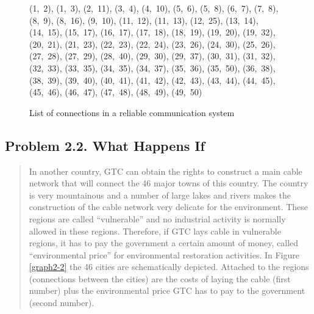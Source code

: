 \begin{enumerate}[(a)]
\begin{figure}[H]
	\centering
	\begin{multicols}{5}
(1,~2), (1,~3), (2,~11), (3,~4), (4,~10), (5,~6), (5,~8), (6,~7), (7,~8), (8,~9), (8,~16), (9,~10), (11,~12), (11,~13), (12,~25), (13,~14), (14,~15), (15,~17), (16,~17), (17,~18), (18,~19), (19,~20), (19,~32), (20,~21), (21,~23), (22,~23), (22,~24), (23,~26), (24,~30), (25,~26), (27,~28), (27,~29), (28,~40), (29,~30), (29,~37), (30,~31), (31,~32), (32,~33), (33,~35), (34,~35), (34,~37), (35,~36), (35,~50), (36,~38), (38,~39), (39,~40), (40,~41), (41,~42), (42,~43), (43,~44), (44,~45), (45,~46), (46,~47), (47,~48), (48,~49), (49,~50)
	\end{multicols}
	\caption{List of connections in a reliable communication system}
	\label{reliable1}
\end{figure}

\end{enumerate}

\subsection{Problem 2.2. What Happens If}
\begin{quote}In another country, GTC can obtain the rights to construct a main cable network that
will connect the 46 major towns of this country. The country is very mountainous
and a number of large lakes and rivers makes the construction of the cable network
very delicate for the environment. These regions are called ``vulnerable'' and no industrial
activity is normally allowed in these regions. Therefore, if GTC lays cable in
vulnerable regions, it has to pay the government a certain amount of money, called
``environmental price'' for environmental restoration activities. In Figure \ref{graph2-2} the 46
cities are schematically depicted. Attached to the regions (connections between the
cities) are the costs of laying the cable (first number) plus the environmental price
GTC has to pay to the government (second number).\end{quote}

